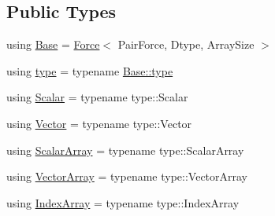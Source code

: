 \subsection*{Public Types}
\begin{DoxyCompactItemize}
\item 
using \mbox{\hyperlink{struct_space_h_1_1_vel_dep_force_a47a0c85f93ae37d3cce8f708df096c65}{Base}} = \mbox{\hyperlink{struct_space_h_1_1_force}{Force}}$<$ Pair\+Force, Dtype, Array\+Size $>$
\item 
using \mbox{\hyperlink{struct_space_h_1_1_vel_dep_force_a734e14a30f08b7c4bf6c8cd529c0bd1c}{type}} = typename \mbox{\hyperlink{struct_space_h_1_1_force_a151c6ae1ec7ad87825c2b6cc74aee5f2}{Base\+::type}}
\item 
using \mbox{\hyperlink{struct_space_h_1_1_vel_dep_force_abbc363fffee12f9e015fd4978c132aad}{Scalar}} = typename type\+::\+Scalar
\item 
using \mbox{\hyperlink{struct_space_h_1_1_vel_dep_force_a229c41eb710a16ec67978bb98c532622}{Vector}} = typename type\+::\+Vector
\item 
using \mbox{\hyperlink{struct_space_h_1_1_vel_dep_force_ae4efbb88779fc063293b7853184378ac}{Scalar\+Array}} = typename type\+::\+Scalar\+Array
\item 
using \mbox{\hyperlink{struct_space_h_1_1_vel_dep_force_ad2d0301ffff67a74018b92c17a3475de}{Vector\+Array}} = typename type\+::\+Vector\+Array
\item 
using \mbox{\hyperlink{struct_space_h_1_1_vel_dep_force_a81473a733ed71f51b81323c705283195}{Index\+Array}} = typename type\+::\+Index\+Array
\end{DoxyCompactItemize}
